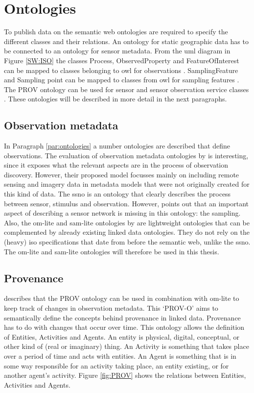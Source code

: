 \section{Ontologies}
To publish data on the semantic web ontologies are required to specify the different classes and their relations. An ontology for static geographic data has to be connected to an ontology for sensor metadata. From the \ac{uml} diagram in Figure \ref{SW:ISO} the classes Process, ObservedProperty and FeatureOfInterest can be mapped to classes belonging to \ac{owl} for observations \citep{SSW:Cox}. SamplingFeature and Sampling point can be mapped to classes from \ac{owl} for sampling features \citep{SSW:Cox2}. The PROV ontology can be used for sensor and sensor observation service classes \citep{LD:W3C2}. These ontologies will be described in more detail in the next paragraphs.

\subsection{Observation metadata}
In Paragraph \ref{par:ontologies} a number ontologies are described that define observations. The evaluation of observation metadata ontologies by \cite{SW:Hu} is interesting, since it exposes what the relevant aspects are in the process of observation discovery. However, their proposed model focusses mainly on including remote sensing and imagery data in metadata models that were not originally created for this kind of data. The \ac{ssno} is an ontology that clearly describes the process between sensor, stimulus and observation. However, \cite{SSW:Cox4} points out that an important aspect of describing a sensor network is missing in this ontology: the sampling. Also, the om-lite and sam-lite ontologies by \cite{SSW:Cox4} are lightweight ontologies that can be complemented by already existing linked data ontologies. They do not rely on the (heavy) \ac{iso} specifications that date from before the semantic web, unlike the \ac{ssno}. The om-lite and sam-lite ontologies will therefore be used in this thesis. 

\subsection{Provenance}
\cite{SSW:Cox4} describes that the PROV ontology can be used in combination with om-lite to keep track of changes in observation metadata. This `PROV-O' aims to semantically define the concepts behind provenance in linked data. Provenance has to do with changes that occur over time. This ontology allows the definition of Entities, Activities and Agents. An entity is physical, digital, conceptual, or other kind of (real or imaginary) thing. An Activity is something that takes place over a period of time and acts with entities. An Agent is something that is in some way responsible for an activity taking place, an entity existing, or for another agent's activity. Figure \ref{fig:PROV} shows the relations between  Entities, Activities and Agents.   

